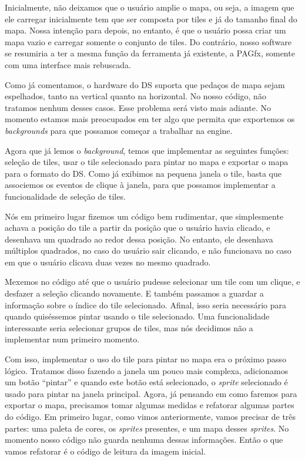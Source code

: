 \documentclass[brazil]{abnt}
\begin{document}
Inicialmente, não deixamos que o usuário amplie o mapa, ou seja, a imagem que ele carregar inicialmente tem que ser composta por tiles e já do tamanho final do mapa. Nossa intenção para depois, no entanto, é que o usuário possa criar um mapa vazio e carregar somente o conjunto de tiles. Do contrário, nosso software se resumiria a ter a mesma função da ferramenta já existente, a PAGfx, somente com uma interface mais rebuscada.

Como já comentamos, o hardware do DS suporta que pedaços de mapa sejam espelhados, tanto na vertical quanto na horizontal. No nosso código, não tratamos nenhum desses casos. Esse problema será visto mais adiante. No momento estamos mais preocupados em ter algo que permita que exportemos os \textit{backgrounds} para que possamos começar a trabalhar na engine.

Agora que já lemos o \textit{background}, temos que implementar as seguintes funções: seleção de tiles, usar o tile selecionado para pintar no mapa e exportar o mapa para o formato do DS. Como já exibimos na pequena janela o tile, basta que associemos os eventos de clique à janela, para que possamos implementar a funcionalidade de seleção de tiles.

Nós em primeiro lugar fizemos um código bem rudimentar, que simplesmente achava a posição do tile a partir da posição que o usuário havia clicado, e desenhava um quadrado ao redor dessa posição. No entanto, ele desenhava múltiplos quadrados, no caso do usuário sair clicando, e não funcionava no caso em que o usuário clicava duas vezes no mesmo quadrado.

Mexemos no código até que o usuário pudesse selecionar um tile com um clique, e desfazer a seleção clicando novamente. E também passamos a guardar a informação sobre o índice do tile selecionado. Afinal, isso seria necessário para quando quiséssemos pintar usando o tile selecionado. Uma funcionalidade interessante seria selecionar grupos de tiles, mas nós decidimos não a implementar num primeiro momento.

Com isso, implementar o uso do tile para pintar no mapa era o próximo passo lógico. Tratamos disso fazendo a janela um pouco mais complexa, adicionamos um botão ``pintar'' e quando este botão está selecionado, o \textit{sprite} selecionado é usado para pintar na janela principal. Agora, já pensando em como faremos para exportar o mapa, precisamos tomar algumas medidas e refatorar algumas partes do código. Em primeiro lugar, como vimos anteriormente, vamos precisar de três partes: uma paleta de cores, os \textit{sprites} presentes, e um mapa desses \textit{sprites}. No momento nosso código não guarda nenhuma dessas informações. Então o que vamos refatorar é o código de leitura da imagem inicial.
\end{document}

